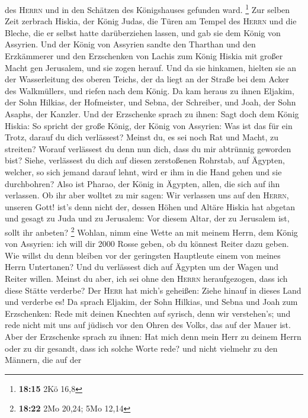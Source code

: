des \textsc{Herrn} und in den Schätzen des Königshauses gefunden ward.
\footnote{\textbf{18:15} 2Kö 16,8}  Zur selben Zeit
zerbrach Hiskia, der König Judas, die Türen am Tempel des \textsc{Herrn}
und die Bleche, die er selbst hatte darüberziehen lassen, und gab sie
dem König von Assyrien.  Und der König von Assyrien
sandte den Tharthan und den Erzkämmerer und den Erzschenken von Lachis
zum König Hiskia mit großer Macht gen Jerusalem, und sie zogen herauf.
Und da sie hinkamen, hielten sie an der Wasserleitung des oberen Teichs,
der da liegt an der Straße bei dem Acker des Walkmüllers,
 und riefen nach dem König. Da kam heraus zu ihnen
Eljakim, der Sohn Hilkias, der Hofmeister, und Sebna, der Schreiber, und
Joah, der Sohn Asaphs, der Kanzler.  Und der Erzschenke
sprach zu ihnen: Sagt doch dem König Hiskia: So spricht der große König,
der König von Assyrien: Was ist das für ein Trotz, darauf du dich
verlässest?  Meinst du, es sei noch Rat und Macht, zu
streiten? Worauf verlässest du denn nun dich, dass du mir abtrünnig
geworden bist?  Siehe, verlässest du dich auf diesen
zerstoßenen Rohrstab, auf Ägypten, welcher, so sich jemand darauf lehnt,
wird er ihm in die Hand gehen und sie durchbohren? Also ist Pharao, der
König in Ägypten, allen, die sich auf ihn verlassen.  Ob
ihr aber wolltet zu mir sagen: Wir verlassen uns auf den \textsc{Herrn},
unseren Gott! ist's denn nicht der, dessen Höhen und Altäre Hiskia hat
abgetan und gesagt zu Juda und zu Jerusalem: Vor diesem Altar, der zu
Jerusalem ist, sollt ihr anbeten? \footnote{\textbf{18:22} 2Mo 20,24;
  5Mo 12,14}  Wohlan, nimm eine Wette an mit meinem
Herrn, dem König von Assyrien: ich will dir 2000 Rosse geben, ob du
könnest Reiter dazu geben.  Wie willst du denn bleiben
vor der geringsten Hauptleute einem von meines Herrn Untertanen? Und du
verlässest dich auf Ägypten um der Wagen und Reiter willen.
 Meinst du aber, ich sei ohne den \textsc{Herrn}
heraufgezogen, dass ich diese Stätte verderbe? Der \textsc{Herr} hat
mich's geheißen: Ziehe hinauf in dieses Land und verderbe es!
 Da sprach Eljakim, der Sohn Hilkias, und Sebna und Joah
zum Erzschenken: Rede mit deinen Knechten auf syrisch, denn wir
verstehen's; und rede nicht mit uns auf jüdisch vor den Ohren des Volks,
das auf der Mauer ist.  Aber der Erzschenke sprach zu
ihnen: Hat mich denn mein Herr zu deinem Herrn oder zu dir gesandt, dass
ich solche Worte rede? und nicht vielmehr zu den Männern, die auf der
